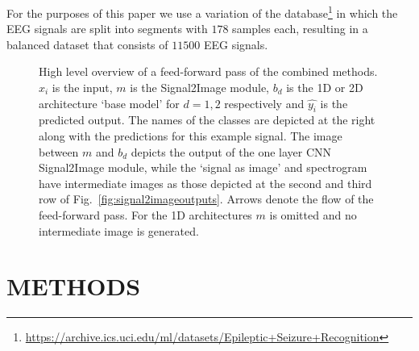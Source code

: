\documentclass[conference]{IEEEtran}
\providecommand{\FILEPATH}{~/github.com/pbizopoulos/signal2image-modules-in-deep-neural-networks-for-eeg-classification/packages/python/tmp}
\begin{document}
For the purposes of this paper we use a variation of the database\footnote{\url{https://archive.ics.uci.edu/ml/datasets/Epileptic+Seizure+Recognition}} in which the EEG signals are split into segments with $178$ samples each, resulting in a balanced dataset that consists of $11500$ EEG signals.

\begin{figure}[!t]
  \centering
  \caption{High level overview of a feed-forward pass of the combined methods.
    $x_i$ is the input, $m$ is the Signal2Image module, $b_{d}$ is the 1D or 2D architecture `base model' for $d=1,2$ respectively and $\hat{y_i}$ is the predicted output.
    The names of the classes are depicted at the right along with the predictions for this example signal.
    The image between $m$ and $b_{d}$ depicts the output of the one layer CNN Signal2Image module, while the `signal as image' and spectrogram have intermediate images as those depicted at the second and third row of Fig.~\ref{fig:signal2imageoutputs}.
    Arrows denote the flow of the feed-forward pass.
  For the 1D architectures $m$ is omitted and no intermediate image is generated.}\label{fig:highleveloverview}
\end{figure}

\section{METHODS}
\end{document}
